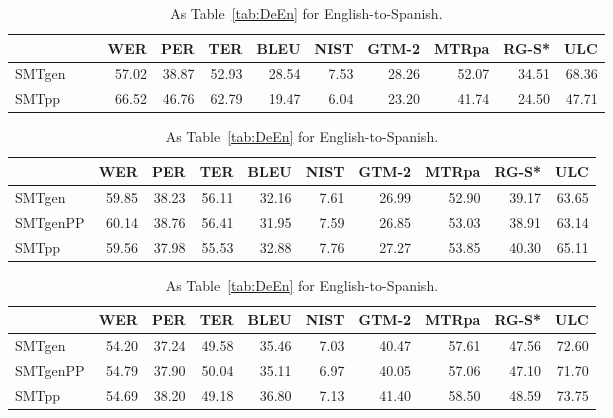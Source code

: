 \documentclass[a4paper,11pt]{article}
\begin{document}
\begin{table}[t]
\small
{}
\begin{tabular}{lrrrrrrrrr}
\toprule
         & WER   &  PER  & TER   &  BLEU & NIST & GTM-2 & MTRpa & RG-S* & ULC \\
\midrule
SMTgen~~~~& 57.02 & 38.87 & 52.93 & 28.54 & 7.53 & 28.26 & 52.07 & 34.51 & 68.36 \\  
SMTpp	 & 66.52 & 46.76 & 62.79 & 19.47 & 6.04 & 23.20 & 41.74 & 24.50 & 47.71 \\  
\bottomrule
\end{tabular}

\begin{tabular}{lrrrrrrrrr}
\toprule
         & WER   &  PER  & TER   &  BLEU & NIST & GTM-2 & MTRpa & RG-S* & ULC \\
\midrule
SMTgen	 & 59.85 & 38.23 & 56.11 & 32.16 & 7.61 & 26.99 & 52.90 & 39.17 & 63.65 \\  
SMTgenPP & 60.14 & 38.76 & 56.41 & 31.95 & 7.59 & 26.85 & 53.03 & 38.91 & 63.14 \\  
SMTpp	 & 59.56 & 37.98 & 55.53 & 32.88 & 7.76 & 27.27 & 53.85 & 40.30 & 65.11 \\  
\bottomrule
\end{tabular}

\begin{tabular}{lrrrrrrrrr}
\toprule
         & WER   &  PER  & TER   &  BLEU & NIST & GTM-2 & MTRpa & RG-S* & ULC \\
\midrule
SMTgen	 & 54.20 & 37.24 & 49.58 & 35.46 & 7.03 & 40.47 & 57.61 & 47.56 & 72.60 \\  
SMTgenPP & 54.79 & 37.90 & 50.04 & 35.11 & 6.97 & 40.05 & 57.06 & 47.10 & 71.70 \\  
SMTpp	 & 54.69 & 38.20 & 49.18 & 36.80 & 7.13 & 41.40 & 58.50 & 48.59 & 73.75 \\  
\bottomrule
\end{tabular}
 \caption{As Table~\ref{tab:DeEn} for English-to-Spanish.}
 \label{tab:EnEs}
\end{table}
\end{document}
